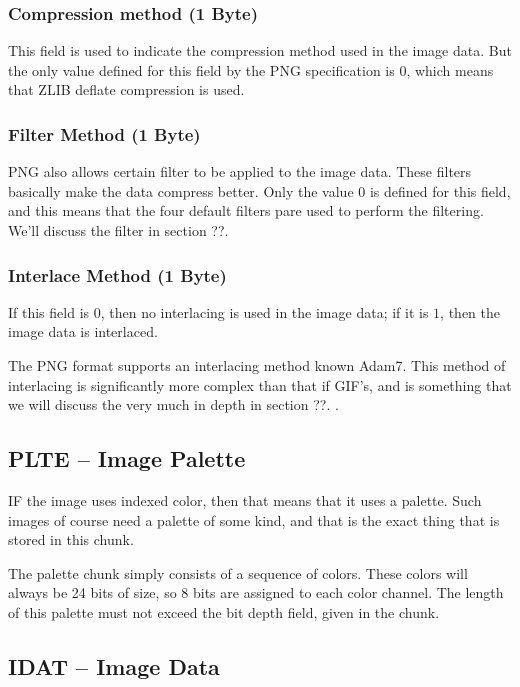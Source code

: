 \subsubsection*{Compression method (1 Byte)}

This field is used to indicate the compression method used in the
image data. But the only value defined for this field by the PNG
specification is $0$, which means that ZLIB deflate compression is
used.

\subsubsection*{Filter Method (1 Byte)}

PNG also allows certain filter to be applied to the image data. These
filters basically make the data compress better. Only the value $0$ is
defined for this field, and this means that the four default filters
pare used to perform the filtering. We'll discuss the filter in section
??.  

\subsubsection*{Interlace Method (1 Byte)}

If this field is $0$, then no interlacing is used in the image data; if it
is $1$, then the image data is interlaced.

The PNG format supports an interlacing method known Adam7. This method
of interlacing is significantly more complex than that if GIF's, and
is something that we will discuss the very much in depth in section
??. .

\subsection{PLTE -- Image Palette}

IF the image uses indexed color, then that means that it uses a
palette. Such images of course need a palette of some kind, and that
is the exact thing that is stored in this chunk.

The palette chunk simply consists of a sequence of colors. These
colors will always be 24 bits of size, so 8 bits are assigned to each
color channel. The length of this palette must not exceed the bit
depth field, given in the  chunk.

\subsection{IDAT -- Image Data}

